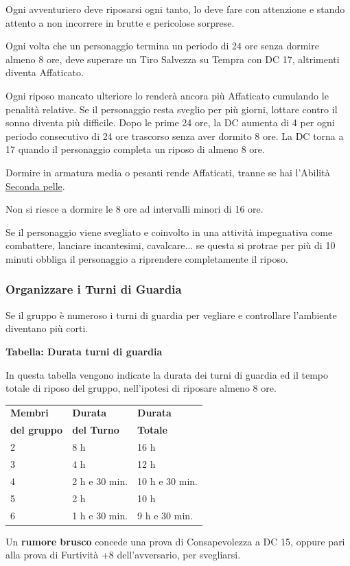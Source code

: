 \begin{multicols}{2}
Ogni avventuriero deve riposarsi ogni tanto, lo deve fare con attenzione e stando attento a non incorrere in brutte e pericolose sorprese.

Ogni volta che un personaggio termina un periodo di 24 ore senza dormire almeno 8 ore, deve superare un Tiro Salvezza su Tempra con DC 17, altrimenti diventa Affaticato.

Ogni riposo mancato ulteriore lo renderà ancora più Affaticato cumulando le penalità relative. Se il personaggio resta sveglio per più giorni, lottare contro il sonno diventa più difficile. Dopo le prime 24 ore, la DC aumenta di 4 per ogni periodo consecutivo di 24 ore trascorso senza aver dormito 8 ore. La DC torna a 17 quando il personaggio completa un riposo di almeno 8 ore.

Dormire in armatura media o pesanti rende Affaticati, tranne se hai l'Abilità \hyperlink{secondapelle}{Seconda pelle}.

Non si riesce a dormire le 8 ore ad intervalli minori di 16 ore.

Se il personaggio viene svegliato e coinvolto in una attività impegnativa come combattere, lanciare incantesimi, cavalcare... se questa si protrae per più di 10 minuti obbliga il personaggio a riprendere completamente il riposo.

\subsubsection{Organizzare i Turni di Guardia}

Se il gruppo è numeroso i turni di guardia per vegliare e controllare l'ambiente diventano più corti.

\medskip{}

\textbf{Tabella: Durata turni di guardia}

In questa tabella vengono indicate la durata dei turni di guardia ed il tempo totale di riposo del gruppo, nell'ipotesi di riposare almeno 8 ore.

\medskip{}

\noindent\begin{tabularx}{\linewidth}{XXX}
	\toprule
\rowcolor{gray!20}\textbf{Membri} &\textbf{Durata}&\textbf{Durata}\\
\textbf{del gruppo}&\textbf{del Turno}&\textbf{Totale}\\
\toprule
\rowcolor{gray!20}2& 8 h& 16 h\\
3& 4 h & 12 h\\
\rowcolor{gray!20}4& 2 h e 30 min. & 10 h e 30 min.\\
5& 2 h& 10 h\\
\rowcolor{gray!20}6& 1 h e 30 min. & 9 h e 30 min.
\end{tabularx}

\medskip{}

Un \textbf{rumore brusco} concede una prova di Consapevolezza a DC 15, oppure pari alla prova di Furtività +8 dell'avversario, per svegliarsi.

\end{multicols}

